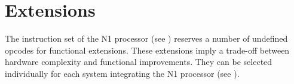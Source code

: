 
\section{Extensions}
\label{extensions}

The instruction set of the N1 processor (see ) reserves a number
of undefined \glspl{opcode} for functional extensions.
These extensions imply a trade-off between hardware complexity and functional 
improvements.
They can be selected individually for each system integrating the N1 processor
(see ).    

